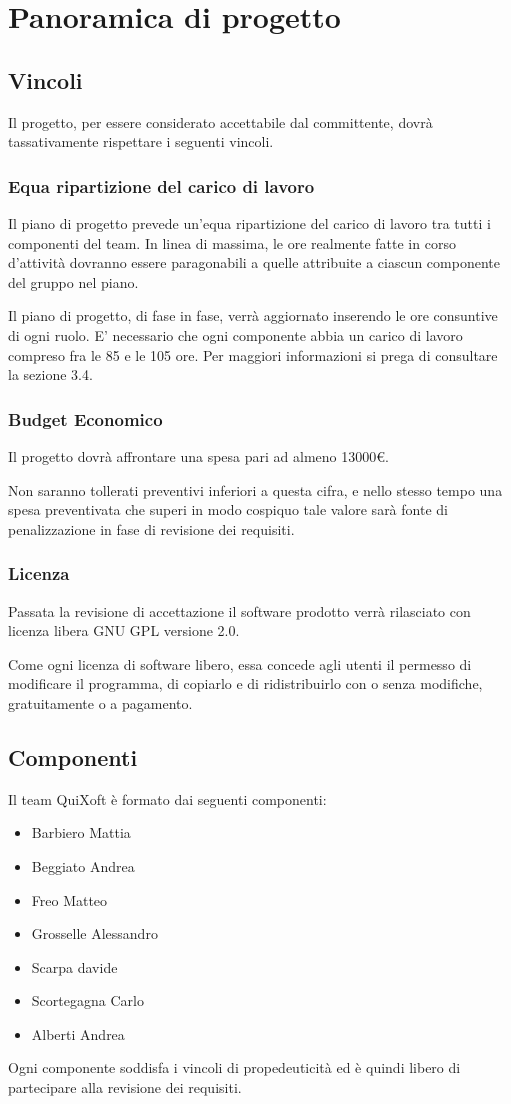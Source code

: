 \documentclass[11pt,a4paper]{article}
\begin{document}
\section{Panoramica di progetto}
\subsection{Vincoli}
Il progetto, per essere considerato accettabile dal committente, dovrà tassativamente rispettare i seguenti vincoli.
\subsubsection{Equa ripartizione del carico di lavoro}
Il piano di progetto prevede un'equa ripartizione del carico di lavoro tra tutti i componenti del team.
In linea di massima, le ore realmente fatte in corso d'attività dovranno essere paragonabili a quelle attribuite a ciascun componente del gruppo nel piano.

Il piano di progetto, di fase in fase, verrà aggiornato inserendo le ore consuntive di ogni ruolo.
E' necessario che ogni componente abbia un carico di lavoro compreso fra le 85 e le 105 ore. Per maggiori informazioni si prega di consultare la sezione 3.4.
\subsubsection{Budget Economico}
Il progetto dovrà affrontare una spesa pari ad almeno 13000\euro.

Non saranno tollerati preventivi inferiori a questa cifra, e nello stesso tempo una spesa preventivata che superi in modo cospiquo tale valore sarà fonte di penalizzazione in fase di revisione dei requisiti.
\subsubsection{Licenza}
Passata la revisione di accettazione il software prodotto verrà rilasciato con licenza libera GNU GPL versione 2.0.

Come ogni licenza di software libero, essa concede agli utenti il permes\-so di modificare il programma, di copiarlo e di ridistribuirlo con o senza modifiche, gratuitamente o a pagamento.
\subsection{Componenti}
Il team QuiXoft è formato dai seguenti componenti:
\begin{itemize}
\item Barbiero Mattia
\item Beggiato Andrea
\item Freo Matteo
\item Grosselle Alessandro
\item Scarpa davide
\item Scortegagna Carlo
\item Alberti Andrea
\end{itemize}
Ogni componente soddisfa i vincoli di propedeuticità ed è quindi libero di partecipare alla revisione dei requisiti.
\end{document}
